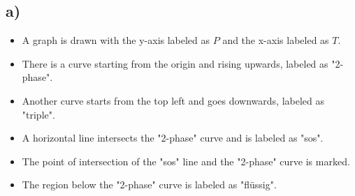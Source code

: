 

\subsection*{a)}
\begin{itemize}
    \item A graph is drawn with the y-axis labeled as \(P\) and the x-axis labeled as \(T\).
    \item There is a curve starting from the origin and rising upwards, labeled as "2-phase".
    \item Another curve starts from the top left and goes downwards, labeled as "triple".
    \item A horizontal line intersects the "2-phase" curve and is labeled as "sos".
    \item The point of intersection of the "sos" line and the "2-phase" curve is marked.
    \item The region below the "2-phase" curve is labeled as "flüssig".
\end{itemize}